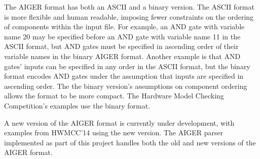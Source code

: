 \documentclass[12pt,a4paper,twoside,openright]{report}
\begin{document}
The AIGER format has both an ASCII and a binary version. The ASCII
format is more flexible and human readable, imposing fewer constraints
on the ordering of components within the input file. For example, an
AND gate with variable name 20 may be specified before an AND gate with
variable name 11 in the ASCII format, but AND gates must be specified in
ascending order of their variable names in the binary AIGER format. Another
example is that AND gates' inputs can be specified in any order in the ASCII
format, but the binary format encodes AND gates under the assumption
that inputs are specified in ascending order.
The the binary version's assumptions on component ordering allows the format
to be more compact. The Hardware Model Checking Competition's examples
use the binary format.

A new version of the AIGER format is currently under development, with
examples from HWMCC'14 using the new version. The AIGER parser implemented
as part of this project handles both the old and new versions of the AIGER
format.
\end{document}
